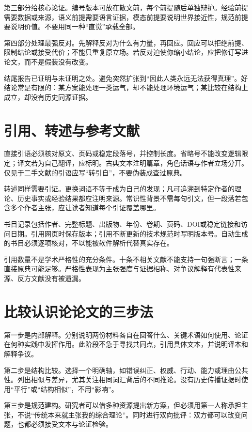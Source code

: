 第三部分给核心论证。编号版本可放在散文前，每个前提随后单独辩护。经验前提需要数据或来源，语义前提需要语言证据，模态前提要说明世界接近性，规范前提要说明价值。不要用同一种“直觉”承载全部。

第四部分处理最强反对。先解释反对为什么有力量，再回应。回应可以拒绝前提、限制结论或接受代价；不能只重复原立场。若反对迫使你缩小结论，应把修订写进论文，而不是假装没有改变。

结尾报告已证明与未证明之处。避免突然扩张到“因此人类永远无法获得真理”。好结论常是有限的：某方案能处理一类运气，却不能处理环境运气；某比较在结构上成立，却没有历史同源证据。

\section{引用、转述与参考文献}

直接引语必须核对原文、页码或稳定段落号，并控制长度。省略号不能改变逻辑限定；译文若为自己翻译，应标明。古典文本注明篇章，角色话语与作者立场分开。仅见于二手文献的引语应写“转引自”，不要伪装成查过原典。

转述同样需要引证。更换词语不等于成为自己的发现；凡可追溯到特定作者的理论、历史事实或经验结果都应注明来源。常识性背景不需每句引文，但一段落若包含多个作者主张，应让读者知道每个引证覆盖哪里。

书目记录包括作者、完整标题、出版物、年份、卷期、页码、DOI或稳定链接和访问日期。引用网页时保存版本；引用不断更新的技术规范时写明版本号。自动生成的书目必须逐项核对，不以能被软件解析代替真实存在。

引用数量不是学术严格性的充分条件。十条不相关文献不能支持一句强断言；一条直接原典可能足够。严格性表现为主张强度与证据相称、对争议解释有代表性来源、反方文献没有被遗漏。

\section{比较认识论论文的三步法}

第一步是内部解释。分别说明两份材料各自在回答什么、关键术语如何使用、论证在何种实践中发挥作用。此阶段不急于寻找共同点，引用具体文本，并说明译本和解释争议。

第二步是结构比较。选择一个明确轴，如错误纠正、权威、行动、能力或理由公共性。列出相似与差异，尤其关注相同词汇背后的不同推论。没有历史传播证据时使用“平行”或“结构相似”，不用“影响”。

第三步是规范建构。研究者可以借多种资源提出新方案，但必须用第一人称承担主张，不说“传统本来就主张我的综合理论”。同时进行双向批评：双方都可以改变问题，也都必须接受文本与论证检验。

